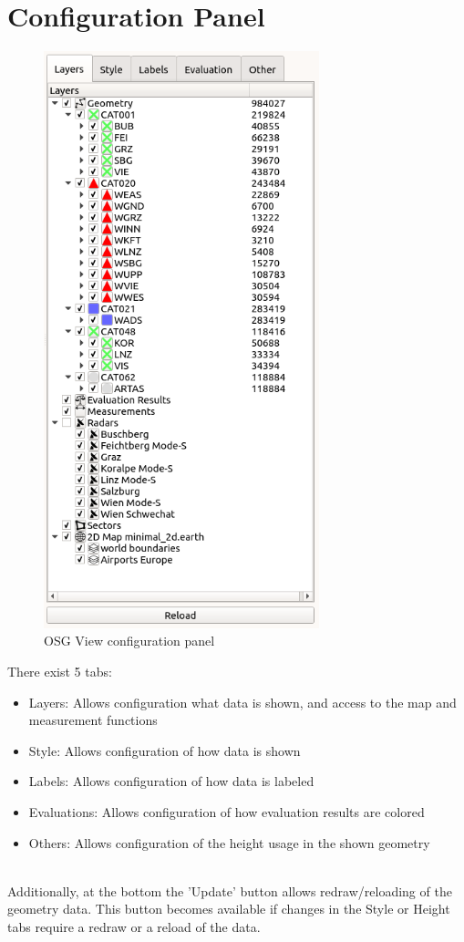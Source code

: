\section{Configuration Panel}
\label{sec:osgview_config_panel}

\begin{figure}[H]
    \includegraphics[width=8cm,frame]{figures/osgview_config_panel.png}
  \caption{OSG View configuration panel}
\end{figure}

There exist 5 tabs:
\begin{itemize}
 \item Layers: Allows configuration what data is shown, and access to the map and measurement functions
 \item Style: Allows configuration of how data is shown
 \item Labels: Allows configuration of how data is labeled
 \item Evaluations: Allows configuration of how evaluation results are colored
 \item Others: Allows configuration of the height usage in the shown geometry
\end{itemize}
\ \\

Additionally, at the bottom the 'Update' button allows redraw/reloading of the geometry data. This button becomes available if changes in the Style or Height tabs require a redraw or a reload of the data. \\


 
 
 
 
